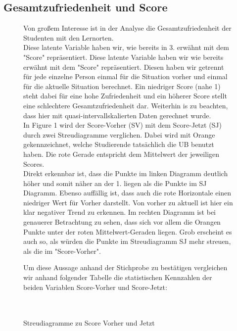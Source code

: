 \documentclass[11pt, a4paper]{article}
\begin{document}
\subsection{Gesamtzufriedenheit und Score}
\begin{figure}[htb]
Von großem Interesse ist in der Analyse die Gesamtzufriedenheit der Studenten mit den Lernorten.\\ Diese latente Variable haben wir, wie bereits in 3. erwähnt mit dem "Score" repräsentiert. Diese latente Variable haben wir wie bereits erwähnt mit dem "Score" repräsentiert.
Diesen haben wir getrennt für jede einzelne Person einmal für die Situation vorher und einmal für die aktuelle Situation berechnet.
Ein niedriger Score (nahe 1) steht dabei für eine hohe Zufriedenheit und ein höherer Score stellt eine schlechtere Gesamtzufriedenheit dar.
Weiterhin is zu beachten, dass hier mit quasi-intervallskalierten Daten gerechnet wurde. \\
In Figure 1 wird der Score-Vorher (SV) mit dem Score-Jetzt (SJ) durch zwei Streudiagramme verglichen.
Dabei wird mit Orange gekennzeichnet, welche Studierende tatsächlich die UB benutzt haben. Die rote Gerade entspricht dem Mittelwert der jeweiligen Scores. \\
Direkt erkennbar ist, dass die Punkte im linken Diagramm deutlich höher und somit näher an der 1. liegen als die Punkte im SJ Diagramm.
Ebenso auffällig ist, dass auch die rote Horizontale einen niedriger Wert für Vorher darstellt. 
Von vorher zu aktuell ist hier ein klar negativer Trend zu erkennen.
Im rechten Diagramm ist bei genauerer Betrachtung zu sehen, dass sich vor allem die Orangen Punkte unter der roten Mittelwert-Geraden liegen.
Grob erscheint es auch so, als würden die Punkte im Streudiagramm SJ mehr streuen, als die im "Score-Vorher".

{\centering 
\vspace{-2cm}
\caption{Streudiagramme zu Score Vorher und Jetzt}}

\vspace{1cm}
Um diese Aussage anhand der Stichprobe zu bestätigen vergleichen wir anhand folgender Tabelle die statistischen Kennzahlen der beiden Variablen Score-Vorher und Score-Jetzt:\\\\\\
\end{figure}
\end{document}
